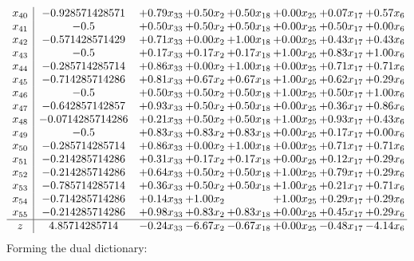 \documentclass[8pt]{article}
\begin{document}
\[\begin{array}{c| c c@{\hskip 2pt} c@{\hskip 2pt} c@{\hskip 2pt} c@{\hskip 2pt} c@{\hskip 2pt} c@{\hskip 2pt} }
 x_{40}   &  -0.928571428571 & +  0.79 x_{33} & +  0.50 x_{2} & +  0.50 x_{18} & +  0.00 x_{25} & +  0.07 x_{17} & +  0.57 x_{6}\\
 x_{41}   &  -0.5 & +  0.50 x_{33} & +  0.50 x_{2} & +  0.50 x_{18} & +  0.00 x_{25} & +  0.50 x_{17} & +  0.00 x_{6}\\
 x_{42}   &  -0.571428571429 & +  0.71 x_{33} & +  0.00 x_{2} & +  1.00 x_{18} & +  0.00 x_{25} & +  0.43 x_{17} & +  0.43 x_{6}\\
 x_{43}   &  -0.5 & +  0.17 x_{33} & +  0.17 x_{2} & +  0.17 x_{18} & +  1.00 x_{25} & +  0.83 x_{17} & +  1.00 x_{6}\\
 x_{44}   &  -0.285714285714 & +  0.86 x_{33} & +  0.00 x_{2} & +  1.00 x_{18} & +  0.00 x_{25} & +  0.71 x_{17} & +  0.71 x_{6}\\
 x_{45}   &  -0.714285714286 & +  0.81 x_{33} & +  0.67 x_{2} & +  0.67 x_{18} & +  1.00 x_{25} & +  0.62 x_{17} & +  0.29 x_{6}\\
 x_{46}   &  -0.5 & +  0.50 x_{33} & +  0.50 x_{2} & +  0.50 x_{18} & +  1.00 x_{25} & +  0.50 x_{17} & +  1.00 x_{6}\\
 x_{47}   &  -0.642857142857 & +  0.93 x_{33} & +  0.50 x_{2} & +  0.50 x_{18} & +  0.00 x_{25} & +  0.36 x_{17} & +  0.86 x_{6}\\
 x_{48}   &  -0.0714285714286 & +  0.21 x_{33} & +  0.50 x_{2} & +  0.50 x_{18} & +  1.00 x_{25} & +  0.93 x_{17} & +  0.43 x_{6}\\
 x_{49}   &  -0.5 & +  0.83 x_{33} & +  0.83 x_{2} & +  0.83 x_{18} & +  0.00 x_{25} & +  0.17 x_{17} & +  0.00 x_{6}\\
 x_{50}   &  -0.285714285714 & +  0.86 x_{33} & +  0.00 x_{2} & +  1.00 x_{18} & +  0.00 x_{25} & +  0.71 x_{17} & +  0.71 x_{6}\\
 x_{51}   &  -0.214285714286 & +  0.31 x_{33} & +  0.17 x_{2} & +  0.17 x_{18} & +  0.00 x_{25} & +  0.12 x_{17} & +  0.29 x_{6}\\
 x_{52}   &  -0.214285714286 & +  0.64 x_{33} & +  0.50 x_{2} & +  0.50 x_{18} & +  1.00 x_{25} & +  0.79 x_{17} & +  0.29 x_{6}\\
 x_{53}   &  -0.785714285714 & +  0.36 x_{33} & +  0.50 x_{2} & +  0.50 x_{18} & +  1.00 x_{25} & +  0.21 x_{17} & +  0.71 x_{6}\\
 x_{54}   &  -0.714285714286 & +  0.14 x_{33} & +  1.00 x_{2} &   & +  1.00 x_{25} & +  0.29 x_{17} & +  0.29 x_{6}\\
 x_{55}   &  -0.214285714286 & +  0.98 x_{33} & +  0.83 x_{2} & +  0.83 x_{18} & +  0.00 x_{25} & +  0.45 x_{17} & +  0.29 x_{6}\\
\hline
z    &  4.85714285714 & -0.24 x_{33} & -6.67 x_{2} & -0.67 x_{18} & +  0.00 x_{25} & -0.48 x_{17} & -4.14 x_{6}\\
\end{array}\]
Forming the dual dictionary:
\end{document}
